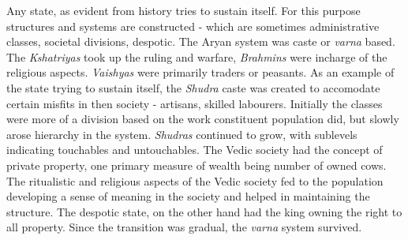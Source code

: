 \documentclass[a4paper]{article}
\begin{document}
Any state, as evident from history tries to sustain itself. For this
purpose structures and systems are constructed - which are sometimes
administrative classes, societal divisions, despotic. The Aryan system
was caste or \textit{varna} based. The \textit{Kshatriyas} took up the
ruling and warfare, \textit{Brahmins} were incharge of the religious
aspects. \textit{Vaishyas} were primarily traders or peasants. As an
example of the state trying to sustain itself, the \textit{Shudra} caste
was created to accomodate certain misfits in then society - artisans,
skilled labourers. Initially the classes were more of a division based
on the work constituent population did, but slowly arose hierarchy in
the system. \textit{Shudras} continued to grow, with sublevels
indicating touchables and untouchables. The Vedic society had the
concept of private property, one primary measure of wealth being  number
of owned cows. The ritualistic and religious aspects of the Vedic
society fed to the population developing a sense of meaning in the
society and helped in maintaining the structure. The despotic state, on
the other hand had the king owning the right to all property. Since the
transition was gradual, the \textit{varna} system survived.


\printbibliography 
\end{document}
